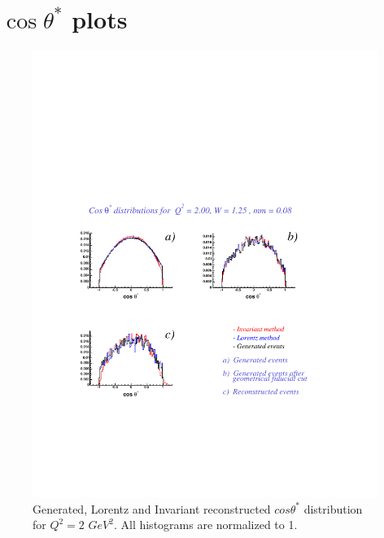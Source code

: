 \chapter{$\cos\theta^*$ plots}\label{sec:costhetaplots}

 
\begin{figure}[h]
 \begin{center}
  \includegraphics[width = 12cm, bb = 60 140 540 540]{appendix/img/ctheta_q22.00_W1.25_mm0.08}
  \caption{Generated, Lorentz and Invariant reconstructed $cos\theta^*$ distribution for $Q^2=2$ $GeV^2$.
           All histograms are normalized to 1.}
 \end{center}
\end{figure} 

